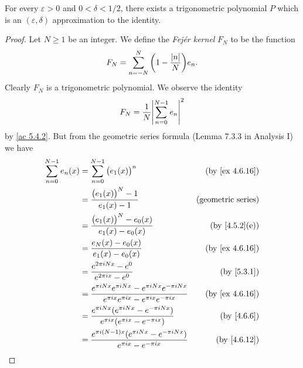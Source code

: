 \begin{lemma}\label{5.4.6}
  For every \(\varepsilon > 0\) and \(0 < \delta < 1 / 2\), there exists a trigonometric polynomial \(P\) which is an \((\varepsilon, \delta)\) approximation to the identity.
\end{lemma}

\begin{proof}
  Let \(N \geq 1\) be an integer.
  We define the \emph{Fejér kernel} \(F_N\) to be the function
  \[
    F_N = \sum_{n = -N}^N \bigg(1 - \frac{\left\lvert n\right\rvert}{N}\bigg) e_n.
  \]
  Clearly \(F_N\) is a trigonometric polynomial.
  We observe the identity
  \[
    F_N = \frac{1}{N} \abs{\sum_{n = 0}^{N - 1} e_n}^2
  \]
  by \cref{ac 5.4.2}.
  But from the geometric series formula (Lemma 7.3.3 in Analysis I) we have
  \begin{align*}
    \sum_{n = 0}^{N - 1} e_n(x) & = \sum_{n = 0}^{N - 1} \big(e_1(x)\big)^n                                                                               & \text{(by \cref{ex 4.6.16})} \\
                                & = \frac{\big(e_1(x)\big)^N - 1}{e_1(x) - 1}                                                                             & \text{(geometric series)}    \\
                                & = \frac{\big(e_1(x)\big)^N - e_0(x)}{e_1(x) - e_0(x)}                                                                   & \text{(by \cref{4.5.2}(e))}  \\
                                & = \frac{e_N(x) - e_0(x)}{e_1(x) - e_0(x)}                                                                               & \text{(by \cref{ex 4.6.16})} \\
                                & = \frac{e^{2 \pi i N x} - e^0}{e^{2 \pi i x} - e^0}                                                                     & \text{(by \cref{5.3.1})}     \\
                                & = \frac{e^{\pi i N x} e^{\pi i N x} - e^{\pi i N x} e^{-\pi i N x}}{e^{\pi i x} e^{\pi i x} - e^{\pi i x} e^{-\pi i x}} & \text{(by \cref{ex 4.6.16})} \\
                                & = \frac{e^{\pi i N x} (e^{\pi i N x} - e^{-\pi i N x})}{e^{\pi i x} (e^{\pi i x} - e^{-\pi i x})}                       & \text{(by \cref{4.6.6})}     \\
                                & = \frac{e^{\pi i (N - 1) x} (e^{\pi i N x} - e^{-\pi i N x})}{e^{\pi i x} - e^{-\pi i x}}                               & \text{(by \cref{4.6.12})}    \\

\end{align*}
\end{proof}
